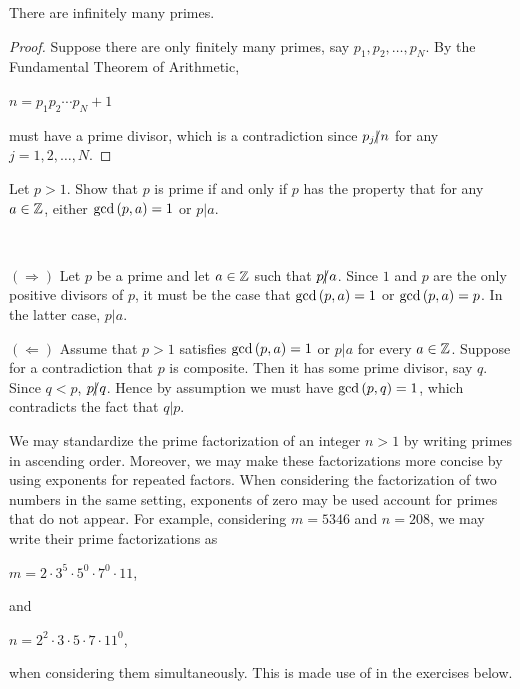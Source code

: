 \documentclass[11pt,fleqn,dvipsnames,usenames]{article}
\newcommand{\p}{\noindent}
\begin{document}
\begin{corollary}
There are infinitely many primes.
\end{corollary}
%
\begin{proof}
Suppose there are only finitely many primes, say $p_{1}, p_{2},\ldots, p_{N}$.  By the Fundamental Theorem of Arithmetic,
\begin{center}
$n = p_{1}p_{2}\cdots p_{N} + 1$
\end{center}
must have a prime divisor, which is a contradiction since $p_{j}|\kern-0.9ex{/} n$ for any $j=1,2,\ldots, N$.
\end{proof}

\begin{example}
Let $p > 1$.  Show that $p$ is prime if and only if $p$ has the property that for any $a\in\mathbb{Z}$, either $\text{gcd}\left(p,a\right) = 1$ or $p|a$.
\end{example}
%
\begin{solution}~

\p $(\Rightarrow)$ Let $p$ be a prime and let $a\in\mathbb{Z}$ such that $p|\kern-0.9ex{/} a$.  Since $1$ and $p$ are the only positive divisors of $p$, it must be the case that $\text{gcd}\left(p,a\right) = 1$ or $\text{gcd}\left(p,a\right) = p$.  In the latter case, $p|a$.
\vsp

\p $(\Leftarrow)$ Assume that $p>1$ satisfies $\text{gcd}\left(p,a\right) = 1$ or $p|a$ for every $a\in\mathbb{Z}$.  Suppose for a contradiction that $p$ is composite.  Then it has some prime divisor, say $q$.  Since $q < p$, $p|\kern-0.9ex{/} q$.  Hence by assumption we must have $\text{gcd}\left(p,q\right) = 1$, which contradicts the fact that $q|p$.
\end{solution}
%
\begin{remark}
We may standardize the prime factorization of an integer $n > 1$ by writing primes in ascending order.  Moreover, we may make these factorizations more concise by using exponents for repeated factors.  When considering the factorization of two numbers in the same setting, exponents of zero may be used account for primes that do not appear.  For example, considering $m = 5346$ and $n = 208$, we may write their prime factorizations as
\begin{center}
$m = 2\cdot 3^5\cdot 5^0 \cdot 7^0\cdot 11$,
\end{center}
and
\begin{center}
$n = 2^2\cdot 3\cdot 5\cdot 7\cdot 11^{0}$,
\end{center}
when considering them simultaneously.  This is made use of in the exercises below.
\end{remark}
\end{document}

